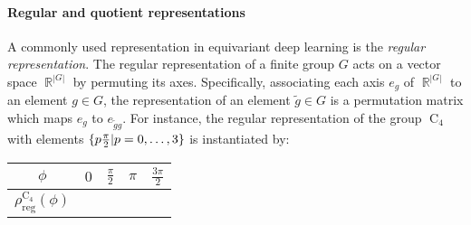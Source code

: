 \documentclass{article}
\DeclareMathOperator*{\R}{\mathbb{R}}
\newcommand{\C}[1]{\ensuremath{\operatorname{C}_{#1}}}
\begin{document}
\paragraph{Regular and quotient representations}
A commonly used representation in equivariant deep learning is the \textit{regular representation}.
The regular representation of a finite group $G$ acts on a vector space $\R^{|G|}$ by permuting its axes.
Specifically, associating each axis $e_g$ of $\R^{|G|}$ to an element $g\in G$, the representation of an element $\tilde{g}\in G$ is a permutation matrix which maps $e_g$ to $e_{\tilde{g}g}$.
For instance, the regular representation of the group $\C4$ with elements $\{p {\pi\over 2} | p=0,\dots,3 \}$ is instantiated by:
\begin{center}
\setlength{\tabcolsep}{8pt}\renewcommand{}\begin{tabular}{c|cccc}
    $\phi$ & $0$ & $\frac{\pi}{2}$ & $\pi$ & $\frac{3\pi}{2}$ \\ \hline
    $\rho_\text{reg}^{\C4}(\phi)$ 
    {\def\arraystretch{1.5} $\vphantom{\begin{bmatrix} c\\r\\a\\p \end{bmatrix}}$} &
    {\def\arraystretch{1.25}$\begin{bmatrix}
        1 & 0 & 0 & 0 \\
        0 & 1 & 0 & 0 \\
        0 & 0 & 1 & 0 \\
        0 & 0 & 0 & 1 \\
    \end{bmatrix}$}
    &
    {\def\arraystretch{1.25}$\begin{bmatrix}
        0 & 0 & 0 & 1 \\
        1 & 0 & 0 & 0 \\
        0 & 1 & 0 & 0 \\
        0 & 0 & 1 & 0 \\
    \end{bmatrix}$}
    &
    {\def\arraystretch{1.25}$\begin{bmatrix}
        0 & 0 & 1 & 0 \\
        0 & 0 & 0 & 1 \\
        1 & 0 & 0 & 0 \\
        0 & 1 & 0 & 0 \\
    \end{bmatrix}$}
    &
    {\def\arraystretch{1.25}$\begin{bmatrix}
        0 & 1 & 0 & 0 \\
        0 & 0 & 1 & 0 \\
        0 & 0 & 0 & 1 \\
        1 & 0 & 0 & 0 \\
    \end{bmatrix}$}
\end{tabular}
\end{center}
\end{document}
